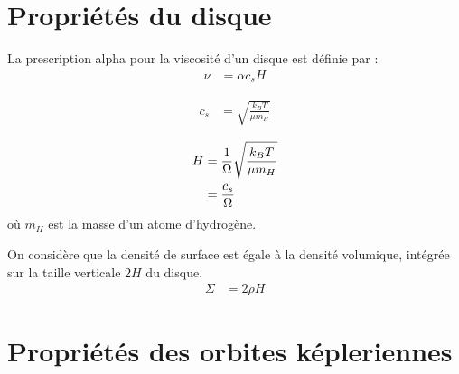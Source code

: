 \section{Propriétés du disque}

La prescription alpha pour la viscosité d'un disque est définie par :
\begin{align}
\nu &= \alpha c_s H
\end{align}

\begin{align}
c_s &= \sqrt{\frac{k_B T}{\mu m_H}}
\end{align}

\begin{align}
H &= \frac{1}{\Omega}\sqrt{\frac{k_B T}{\mu m_H}}\\
&= \frac{c_s}{\Omega}
\end{align}
où $m_H$ est la masse d'un atome d'hydrogène.

On considère que la densité de surface est égale à la densité volumique, intégrée sur la taille verticale $2H$ du disque. 
\begin{align}
\Sigma &= 2\rho H
\end{align}

\section{Propriétés des orbites képleriennes}
